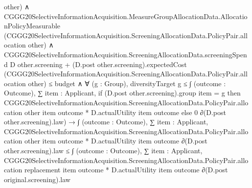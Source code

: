 \documentclass[10pt]{article}
\begin{document}
\begin{ReviewVerbatim}
                                          other) ∧
                                      CGGG20SelectiveInformationAcquisition.MeasureGroupAllocationData.AllocationPolicyMeasurable
                                          (CGGG20SelectiveInformationAcquisition.ScreeningAllocationData.PolicyPair.allocation
                                            other) ∧
                                        CGGG20SelectiveInformationAcquisition.ScreeningAllocationData.screeningSpend D
                                                other.screening +
                                              (D.post other.screening).expectedCost
                                                (CGGG20SelectiveInformationAcquisition.ScreeningAllocationData.PolicyPair.allocation
                                                  other) ≤
                                            budget ∧
                                          ∀ (g : Group),
                                            diversityTarget g ≤
                                              ∫ (outcome : Outcome),
                                                ∑ item : Applicant,
                                                  if (D.post other.screening).group item = g then
                                                    CGGG20SelectiveInformationAcquisition.ScreeningAllocationData.PolicyPair.allocation
                                                        other item outcome *
                                                      D.actualUtility item outcome
                                                  else 0 ∂(D.post other.screening).law) →
                                  ∫ (outcome : Outcome),
                                      ∑ item : Applicant,
                                        CGGG20SelectiveInformationAcquisition.ScreeningAllocationData.PolicyPair.allocation
                                            other item outcome *
                                          D.actualUtility item outcome ∂(D.post other.screening).law ≤
                                    ∫ (outcome : Outcome),
                                      ∑ item : Applicant,
                                        CGGG20SelectiveInformationAcquisition.ScreeningAllocationData.PolicyPair.allocation
                                            replacement item outcome *
                                          D.actualUtility item outcome ∂(D.post original.screening).law
\end{ReviewVerbatim}
\end{document}
